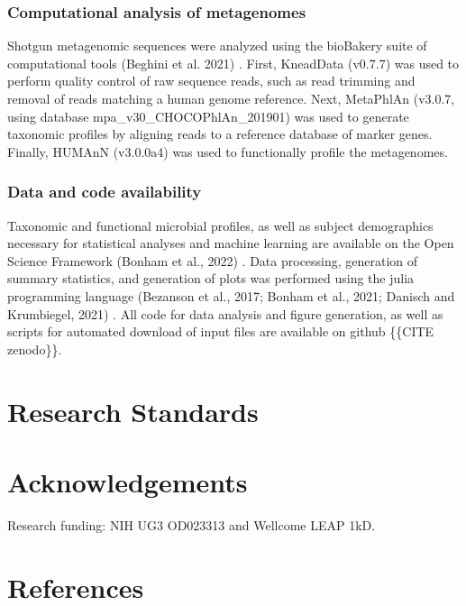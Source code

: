 \documentclass[a4paper]{article}
\begin{document}
\subsubsection{Computational analysis of metagenomes}

Shotgun metagenomic sequences were analyzed using the bioBakery suite of
computational tools
(Beghini
et al. 2021)
\citep{}.
 First, KneadData (v0.7.7) was used to perform quality
control of raw sequence reads, such as read trimming and removal of
reads matching a human genome reference. Next, MetaPhlAn (v3.0.7, using
database mpa\_v30\_CHOCOPhlAn\_201901) was used to generate taxonomic
profiles by aligning reads to a reference database of marker genes.
Finally, HUMAnN (v3.0.0a4) was used to functionally profile the
metagenomes.

\subsubsection{Data and code availability}

Taxonomic and functional microbial profiles, as well as subject
demographics necessary for statistical analyses and machine learning are
available on the Open Science Framework
(Bonham et al.,
2022)
\citep{}.
 Data processing, generation of summary statistics, and
generation of plots was performed using the julia programming language
(Bezanson et al.,
2017; Bonham et al., 2021; Danisch and Krumbiegel, 2021)
\citep{}.
 All code for
data analysis and figure generation, as well as scripts for automated
download of input files are available on github \{\{CITE zenodo\}\}.

\section*{Research Standards}

\section*{Acknowledgements}

Research funding: NIH UG3 OD023313 and Wellcome LEAP 1kD.

\section*{References}

\printbibliography
\end{document}
